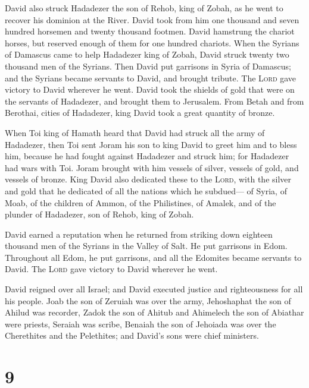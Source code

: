  David also struck Hadadezer the son of Rehob, king of
Zobah, as he went to recover his dominion at the River. 
David took from him one thousand and seven hundred horsemen and twenty
thousand footmen. David hamstrung the chariot horses, but reserved
enough of them for one hundred chariots.  When the Syrians
of Damascus came to help Hadadezer king of Zobah, David struck twenty
two thousand men of the Syrians.  Then David put garrisons
in Syria of Damascus; and the Syrians became servants to David, and
brought tribute. The \textsc{Lord} gave victory to David wherever he
went.  David took the shields of gold that were on the
servants of Hadadezer, and brought them to Jerusalem. 
From Betah and from Berothai, cities of Hadadezer, king David took a
great quantity of bronze.

 When Toi king of Hamath heard that David had struck all
the army of Hadadezer,  then Toi sent Joram his son to
king David to greet him and to bless him, because he had fought against
Hadadezer and struck him; for Hadadezer had wars with Toi. Joram brought
with him vessels of silver, vessels of gold, and vessels of bronze.
 King David also dedicated these to the \textsc{Lord},
with the silver and gold that he dedicated of all the nations which he
subdued---  of Syria, of Moab, of the children of Ammon,
of the Philistines, of Amalek, and of the plunder of Hadadezer, son of
Rehob, king of Zobah.

 David earned a reputation when he returned from striking
down eighteen thousand men of the Syrians in the Valley of Salt.
 He put garrisons in Edom. Throughout all Edom, he put
garrisons, and all the Edomites became servants to David. The
\textsc{Lord} gave victory to David wherever he went.

 David reigned over all Israel; and David executed
justice and righteousness for all his people.  Joab the
son of Zeruiah was over the army, Jehoshaphat the son of Ahilud was
recorder,  Zadok the son of Ahitub and Ahimelech the son
of Abiathar were priests, Seraiah was scribe,  Benaiah
the son of Jehoiada was over the Cherethites and the Pelethites; and
David's sons were chief ministers.

\hypertarget{section-8}{%
\section{9}\label{section-8}}

